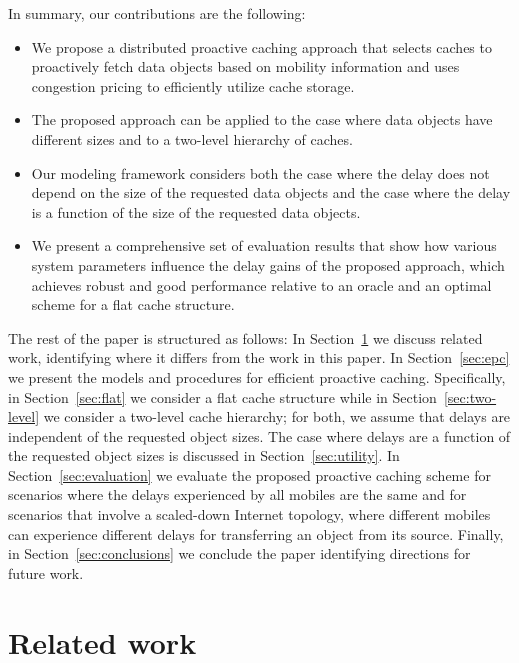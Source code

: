 \documentclass[conference]{IEEEtran}
\newcommand{\mynote}[1]{{{\medskip
\footnotesize \em \noindent Note: #1}}\medskip}
\renewcommand{\mynote}[1]{}
\begin{document}
In summary, our contributions  are the following:
\begin{itemize}
\item We propose a distributed proactive caching approach that selects caches to proactively fetch data objects based on mobility information and  uses  congestion pricing to efficiently utilize cache storage.
\item The proposed approach can be  applied to the case where data objects have different sizes and to a two-level hierarchy of caches.
\item Our modeling framework considers both the case where the delay does not depend on the size of the requested data objects  and the case where the delay is a function of the size of the requested data objects.
\item We present a comprehensive set of evaluation results that show how various system parameters influence the delay gains of  the proposed approach, which achieves robust and good performance relative to  an oracle and an optimal scheme for  a flat cache structure.
\end{itemize}
The rest of the paper is structured as follows: In Section~\ref{sec:related} we discuss related work, identifying where it differs from the work in this paper. In Section~\ref{sec:epc} we present the  models and procedures for efficient proactive caching. Specifically, in Section~\ref{sec:flat} we consider  a flat cache structure while in Section~\ref{sec:two-level} we consider a two-level cache hierarchy; for both, we assume that  delays are independent of the requested object sizes. The case where  delays are a function of the requested  object sizes is discussed in Section~\ref{sec:utility}.
In Section~\ref{sec:evaluation} we evaluate the proposed  proactive caching scheme for scenarios where the delays experienced by all mobiles are the same and for scenarios that involve a scaled-down Internet topology, where different mobiles can experience different delays for transferring an object from its source. Finally, in Section~\ref{sec:conclusions} we conclude the paper identifying directions for future work.

\vspace{-0.09in}
\section{Related work}
\label{sec:related}
\vspace{-0.03in}

\mynote{
\begin{itemize}
\item Identify why problem is different from replication and traditional caching.
\item ICN: knowledge of requested data
\item Proactive caching/fetching: \cite{Gol++12,Mal++12,gaddah2010extending} ...
\item Include application-oriented flow control \cite{Wang++06} as related work, since we use its results in the model where the delay depends on the object size. Perhaps not.
\end{itemize}

}
\end{document}
